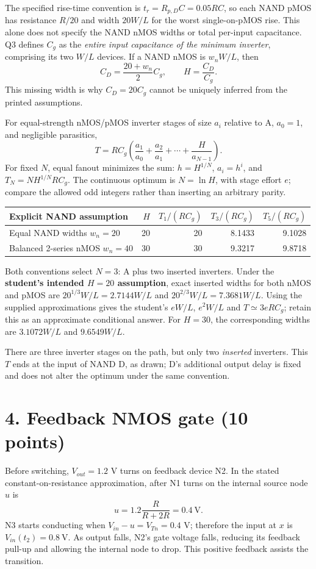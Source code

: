 \documentclass[10pt]{article}
\begin{document}
The specified rise-time convention is $t_r=R_{p,D}C=0.05RC$, so each NAND pMOS has resistance $R/20$ and width $20W/L$ for the worst single-on-pMOS rise. This alone does not specify the NAND nMOS widths or total per-input capacitance. Q3 defines $C_g$ as the \emph{entire input capacitance of the minimum inverter}, comprising its two $W/L$ devices. If a NAND nMOS is $w_nW/L$, then
\[
C_D=\frac{20+w_n}{2}C_g,\qquad H=\frac{C_D}{C_g}.
\]
This missing width is why $C_D=20C_g$ cannot be uniquely inferred from the printed assumptions.

For equal-strength nMOS/pMOS inverter stages of size $a_i$ relative to A, $a_0=1$, and negligible parasitics,
\[
T=RC_g\left(\frac{a_1}{a_0}+\frac{a_2}{a_1}+\cdots+\frac{H}{a_{N-1}}\right).
\]
For fixed $N$, equal fanout minimizes the sum: $h=H^{1/N}$, $a_i=h^i$, and $T_N=N H^{1/N}RC_g$. The continuous optimum is $N=\ln H$, with stage effort $e$; compare the allowed odd integers rather than inserting an arbitrary parity.

\begin{center}\begin{tabular}{lrrrr}\toprule Explicit NAND assumption&$H$&$T_1/(RC_g)$&$T_3/(RC_g)$&$T_5/(RC_g)$\\\midrule
Equal NAND widths $w_n=20$&20&20&8.1433&9.1028\\
Balanced 2-series nMOS $w_n=40$&30&30&9.3217&9.8718\\\bottomrule\end{tabular}\end{center}
Both conventions select $N=3$: A plus two inserted inverters. Under the \textbf{student's intended $H=20$ assumption}, exact inserted widths for both nMOS and pMOS are $20^{1/3}W/L=2.7144W/L$ and $20^{2/3}W/L=7.3681W/L$. Using the supplied approximations gives the student's $eW/L$, $e^2W/L$ and $T\simeq3eRC_g$; retain this as an approximate conditional answer. For $H=30$, the corresponding widths are $3.1072W/L$ and $9.6549W/L$.

There are three inverter stages on the path, but only two \emph{inserted} inverters. This $T$ ends at the input of NAND D, as drawn; D's additional output delay is fixed and does not alter the optimum under the same convention.

\section*{4. Feedback NMOS gate (10 points)}
Before switching, $V_{out}=1.2$ V turns on feedback device N2. In the stated constant-on-resistance approximation, after N1 turns on the internal source node $u$ is
\[
u=1.2\frac{R}{R+2R}=0.4\ \mathrm V.
\]
N3 starts conducting when $V_{in}-u=V_{Tn}=0.4$ V; therefore the input at $x$ is $\boxed{V_{in}(t_2)=0.8\ \mathrm V}$. As output falls, N2's gate voltage falls, reducing its feedback pull-up and allowing the internal node to drop. This positive feedback assists the transition.
\end{document}
